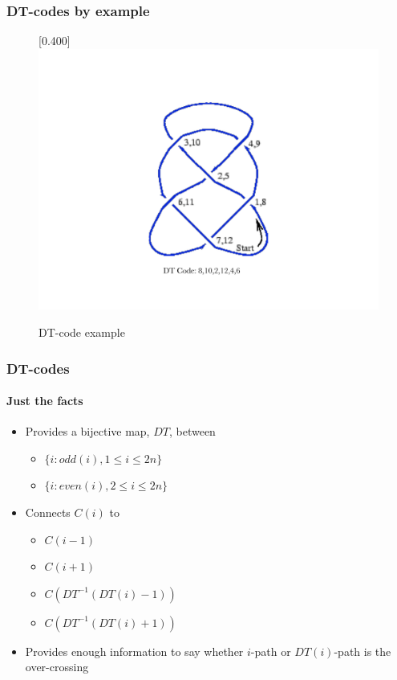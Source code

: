 \documentclass{beamer}
\begin{document}
\begin{frame}
  \frametitle{DT-codes by example}
  \begin{figure}[tbp]
    \centering
    \scalebox{0.4}[0.400]{\includegraphics[viewport=0 125 850 425]{DTCodeExample}}
    \caption{ DT-code example }
  \end{figure}
\end{frame}

\begin{frame}
  \frametitle{DT-codes}
  \framesubtitle{Just the facts}
  \begin{itemize}
    \item Provides a bijective map, $DT$, between 
      \begin{itemize}
        \item $\{ i : odd(i), 1 \leq i \leq 2n \}$
        \item $\{ i : even(i), 2 \leq i \leq 2n \}$
      \end{itemize}
    \item Connects $C(i)$ to 
      \begin{itemize}
        \item $C(i-1)$ 
        \item $C(i+1)$ 
        \item $C(DT^{-1}(DT(i)-1))$
        \item $C(DT^{-1}(DT(i)+1))$ 
      \end{itemize}
    \item Provides enough information to say whether $i$-path or
      $DT(i)$-path is the over-crossing
  \end{itemize}
\end{frame}
\end{document}

